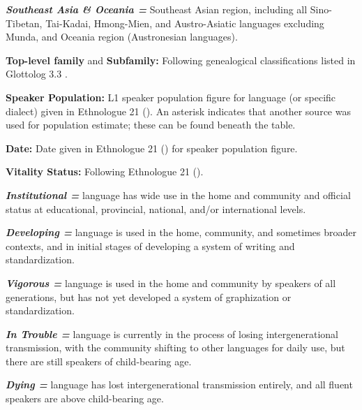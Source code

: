 \textbf{\textit{Southeast Asia \& Oceania =} }Southeast Asian region, including all Sino-Tibetan, Tai-Kadai, Hmong-Mien, and Austro-Asiatic languages excluding Munda, and Oceania region (Austronesian languages).



\textbf{Top-level family} and \textbf{Subfamily:} Following genealogical classifications listed in Glottolog 3.3 \citep{HammarströmEtAl2018}.



\textbf{Speaker Population:} L1 speaker population figure for language (or specific dialect) given in Ethnologue 21 (\citealt{SimonsFennig2018}). An asterisk indicates that another source was used for population estimate; these can be found beneath the table.



\textbf{Date:} Date given in Ethnologue 21 (\citealt{SimonsFennig2018}) for speaker population figure.



\textbf{Vitality Status:} Following Ethnologue 21 (\citealt{SimonsFennig2018}). 



\textbf{\textit{Institutional =}} language has wide use in the home and community and official status at educational, provincial, national, and/or international levels. 



\textbf{\textit{Developing =}} language is used in the home, community, and sometimes broader contexts, and in initial stages of developing a system of writing and standardization. 



\textbf{\textit{Vigorous =}} language is used in the home and community by speakers of all generations, but has not yet developed a system of graphization or standardization. 



\textbf{\textit{In Trouble =}} language is currently in the process of losing intergenerational transmission, with the community shifting to other languages for daily use, but there are still speakers of child-bearing age. 



\textbf{\textit{Dying =}} language has lost intergenerational transmission entirely, and all fluent speakers are above child-bearing age.



